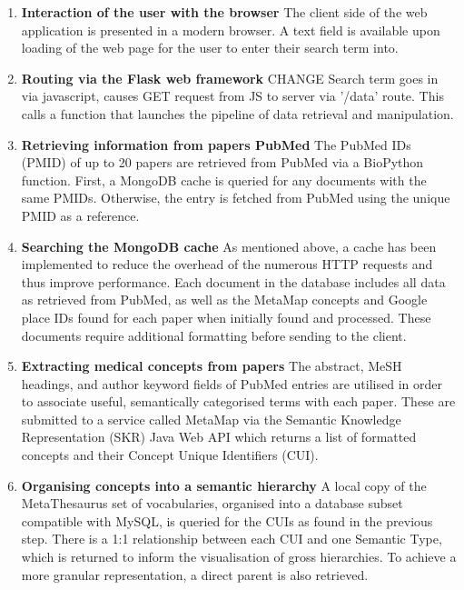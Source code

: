 \documentclass[Report.tex]{subfiles}
\begin{document}
\begin{enumerate}
\item{\textbf{Interaction of the user with the browser}} 
\newline The client side of the web application is presented in a modern browser. A text field is available upon loading of the web page for the user to enter their search term into.
\item{\textbf{Routing via the Flask web framework}}
\newline CHANGE Search term goes in via javascript, causes GET request from JS to server via '/data' route. This calls a function that launches the pipeline of data retrieval and manipulation.
\item{\textbf{Retrieving information from papers PubMed}}
\newline The PubMed IDs (PMID) of up to 20 papers are retrieved from PubMed via a BioPython function\cite{biopython}. First, a MongoDB cache is queried for any documents with the same PMIDs. Otherwise, the entry is fetched from PubMed using the unique PMID as a reference.
\item{\textbf{Searching the MongoDB cache}}
\newline As mentioned above, a cache has been implemented to reduce the overhead of the numerous HTTP requests and thus improve performance. Each document in the database includes all data as retrieved from PubMed, as well as the MetaMap concepts and Google place IDs found for each paper when initially found and processed. These documents require additional formatting before sending to the client.
\item{\textbf{Extracting medical concepts from papers}}
\newline The abstract, MeSH headings, and author keyword fields of PubMed entries are utilised in order to associate useful, semantically categorised terms with each paper. These are submitted to a service called MetaMap via the Semantic Knowledge Representation (SKR) Java Web API which returns a list of formatted concepts and their Concept Unique Identifiers (CUI).
\item{\textbf{Organising concepts into a semantic hierarchy}}
\newline A local copy of the MetaThesaurus set of vocabularies, organised into a database subset compatible with MySQL, is queried for the CUIs as found in the previous step. There is a 1:1 relationship between each CUI and one Semantic Type, which is returned to inform the visualisation of gross hierarchies. To achieve a more granular representation, a direct parent is also retrieved.

\end{enumerate}
\end{document}
